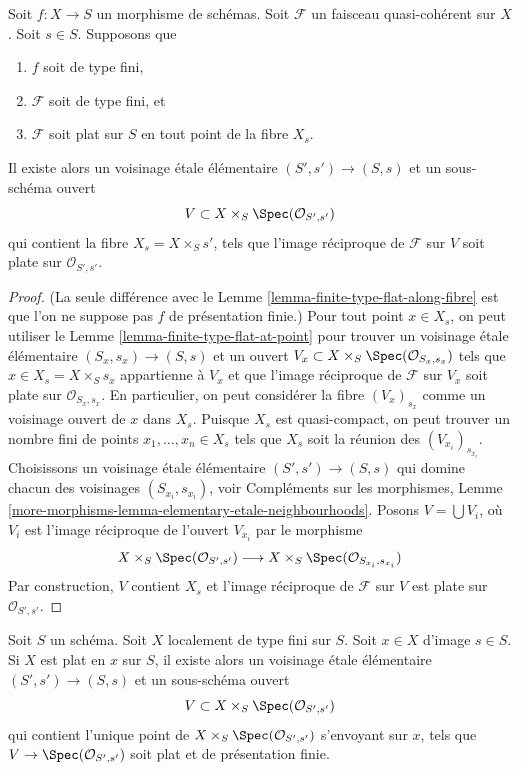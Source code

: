 \begin{lemma}
\label{lemma-finite-type-flat-along-fibre-variant}
Soit $f : X \to S$ un morphisme de schémas.
Soit $\mathcal{F}$ un faisceau quasi-cohérent sur $X$.
Soit $s \in S$.
Supposons que
\begin{enumerate}
\item $f$ soit de type fini,
\item $\mathcal{F}$ soit de type fini, et
\item $\mathcal{F}$ soit plat sur $S$ en tout point de la fibre $X_s$.
\end{enumerate}
Il existe alors un voisinage \'etale élémentaire $(S', s') \to (S, s)$
et un sous-schéma ouvert
$$
V \subset X \times_S \Spec(\mathcal{O}_{S', s'})
$$
qui contient la fibre $X_s = X \times_S s'$, tels que l'image réciproque
de $\mathcal{F}$ sur $V$ soit plate sur $\mathcal{O}_{S', s'}$.
\end{lemma}

\begin{proof}
(La seule différence avec le
Lemme \ref{lemma-finite-type-flat-along-fibre}
est que l'on ne suppose pas $f$ de présentation finie.)
Pour tout point $x \in X_s$, on peut utiliser le
Lemme \ref{lemma-finite-type-flat-at-point}
pour trouver un voisinage \'etale élémentaire $(S_x, s_x) \to (S, s)$
et un ouvert $V_x \subset X \times_S \Spec(\mathcal{O}_{S_x, s_x})$
tels que $x \in X_s = X \times_S s_x$ appartienne à $V_x$ et que
l'image réciproque de $\mathcal{F}$ sur $V_x$ soit plate sur
$\mathcal{O}_{S_x, s_x}$. En particulier, on peut considérer la fibre
$(V_x)_{s_x}$ comme un voisinage ouvert de $x$ dans $X_s$.
Puisque $X_s$ est quasi-compact, on peut trouver un nombre fini de points
$x_1, \ldots, x_n \in X_s$ tels que $X_s$ soit la réunion
des $(V_{x_i})_{s_{x_i}}$. Choisissons un voisinage \'etale élémentaire
$(S' , s') \to (S, s)$ qui domine chacun des voisinages
$(S_{x_i}, s_{x_i})$, voir
Compléments sur les morphismes,
Lemme \ref{more-morphisms-lemma-elementary-etale-neighbourhoods}.
Posons $V = \bigcup V_i$, où $V_i$ est l'image réciproque de l'ouvert
$V_{x_i}$ par le morphisme
$$
X \times_S \Spec(\mathcal{O}_{S', s'})
\longrightarrow
X \times_S \Spec(\mathcal{O}_{S_{x_i}, s_{x_i}})
$$
Par construction, $V$ contient $X_s$ et l'image réciproque
de $\mathcal{F}$ sur $V$ est plate sur $\mathcal{O}_{S', s'}$.
\end{proof}

\begin{lemma}
\label{lemma-finite-type-flat-at-point-X}
Soit $S$ un schéma. Soit $X$ localement de type fini sur $S$.
Soit $x \in X$ d'image $s \in S$.
Si $X$ est plat en $x$ sur $S$, il existe alors un voisinage
\'etale élémentaire $(S', s') \to (S, s)$ et un sous-schéma ouvert
$$
V \subset X \times_S \Spec(\mathcal{O}_{S', s'})
$$
qui contient l'unique point de
$X \times_S \Spec(\mathcal{O}_{S', s'})$ s'envoyant sur $x$,
tels que $V \to \Spec(\mathcal{O}_{S', s'})$
soit plat et de présentation finie.
\end{lemma}

